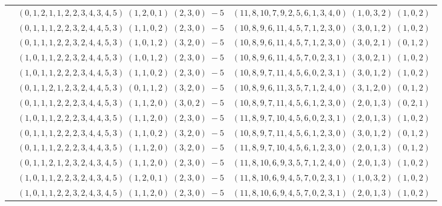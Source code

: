 \documentclass[11pt]{article}
\begin{document}
\begin{longtable}[l]{|c|c|c|}
 \cline{2-3} 
 & $(0 ,1 ,2 ,1 ,1 ,2 ,2 ,3 ,4 ,3 ,4 ,5) \;(1 ,2 ,0 ,1) \;(2 ,3 ,0) \;-5$ & $(11 ,8 ,10 ,7 ,9 ,2 ,5 ,6 ,1 ,3 ,4 ,0) \;(1 ,0 ,3 ,2) \;(1 ,0 ,2) \;$\\ 
 \cline{2-3} 
 & $(0 ,1 ,1 ,1 ,2 ,2 ,3 ,2 ,4 ,4 ,5 ,3) \;(1 ,1 ,0 ,2) \;(2 ,3 ,0) \;-5$ & $(10 ,8 ,9 ,6 ,11 ,4 ,5 ,7 ,1 ,2 ,3 ,0) \;(3 ,0 ,1 ,2) \;(1 ,0 ,2) \;$\\ 
 \cline{2-3} 
 & $(0 ,1 ,1 ,1 ,2 ,2 ,3 ,2 ,4 ,4 ,5 ,3) \;(1 ,0 ,1 ,2) \;(3 ,2 ,0) \;-5$ & $(10 ,8 ,9 ,6 ,11 ,4 ,5 ,7 ,1 ,2 ,3 ,0) \;(3 ,0 ,2 ,1) \;(0 ,1 ,2) \;$\\ 
 \cline{2-3} 
 & $(1 ,0 ,1 ,1 ,2 ,2 ,3 ,2 ,4 ,4 ,5 ,3) \;(1 ,0 ,1 ,2) \;(2 ,3 ,0) \;-5$ & $(10 ,8 ,9 ,6 ,11 ,4 ,5 ,7 ,0 ,2 ,3 ,1) \;(3 ,0 ,2 ,1) \;(1 ,0 ,2) \;$\\ 
 \cline{2-3} 
 & $(1 ,0 ,1 ,1 ,2 ,2 ,2 ,3 ,4 ,4 ,5 ,3) \;(1 ,1 ,0 ,2) \;(2 ,3 ,0) \;-5$ & $(10 ,8 ,9 ,7 ,11 ,4 ,5 ,6 ,0 ,2 ,3 ,1) \;(3 ,0 ,1 ,2) \;(1 ,0 ,2) \;$\\ 
 \cline{2-3} 
 & $(0 ,1 ,1 ,2 ,1 ,2 ,3 ,2 ,4 ,4 ,5 ,3) \;(0 ,1 ,1 ,2) \;(3 ,2 ,0) \;-5$ & $(10 ,8 ,9 ,6 ,11 ,3 ,5 ,7 ,1 ,2 ,4 ,0) \;(3 ,1 ,2 ,0) \;(0 ,1 ,2) \;$\\ 
 \cline{2-3} 
 & $(0 ,1 ,1 ,1 ,2 ,2 ,2 ,3 ,4 ,4 ,5 ,3) \;(1 ,1 ,2 ,0) \;(3 ,0 ,2) \;-5$ & $(10 ,8 ,9 ,7 ,11 ,4 ,5 ,6 ,1 ,2 ,3 ,0) \;(2 ,0 ,1 ,3) \;(0 ,2 ,1) \;$\\ 
 \cline{2-3} 
 & $(1 ,0 ,1 ,1 ,2 ,2 ,2 ,3 ,4 ,4 ,3 ,5) \;(1 ,1 ,2 ,0) \;(2 ,3 ,0) \;-5$ & $(11 ,8 ,9 ,7 ,10 ,4 ,5 ,6 ,0 ,2 ,3 ,1) \;(2 ,0 ,1 ,3) \;(1 ,0 ,2) \;$\\ 
 \cline{2-3} 
 & $(0 ,1 ,1 ,1 ,2 ,2 ,2 ,3 ,4 ,4 ,5 ,3) \;(1 ,1 ,0 ,2) \;(3 ,2 ,0) \;-5$ & $(10 ,8 ,9 ,7 ,11 ,4 ,5 ,6 ,1 ,2 ,3 ,0) \;(3 ,0 ,1 ,2) \;(0 ,1 ,2) \;$\\ 
 \cline{2-3} 
 & $(0 ,1 ,1 ,1 ,2 ,2 ,2 ,3 ,4 ,4 ,3 ,5) \;(1 ,1 ,2 ,0) \;(3 ,2 ,0) \;-5$ & $(11 ,8 ,9 ,7 ,10 ,4 ,5 ,6 ,1 ,2 ,3 ,0) \;(2 ,0 ,1 ,3) \;(0 ,1 ,2) \;$\\ 
 \cline{2-3} 
 & $(0 ,1 ,1 ,2 ,1 ,2 ,3 ,2 ,4 ,3 ,4 ,5) \;(1 ,1 ,2 ,0) \;(2 ,3 ,0) \;-5$ & $(11 ,8 ,10 ,6 ,9 ,3 ,5 ,7 ,1 ,2 ,4 ,0) \;(2 ,0 ,1 ,3) \;(1 ,0 ,2) \;$\\ 
 \cline{2-3} 
 & $(1 ,0 ,1 ,1 ,2 ,2 ,3 ,2 ,4 ,3 ,4 ,5) \;(1 ,2 ,0 ,1) \;(2 ,3 ,0) \;-5$ & $(11 ,8 ,10 ,6 ,9 ,4 ,5 ,7 ,0 ,2 ,3 ,1) \;(1 ,0 ,3 ,2) \;(1 ,0 ,2) \;$\\ 
 \cline{2-3} 
 & $(1 ,0 ,1 ,1 ,2 ,2 ,3 ,2 ,4 ,3 ,4 ,5) \;(1 ,1 ,2 ,0) \;(2 ,3 ,0) \;-5$ & $(11 ,8 ,10 ,6 ,9 ,4 ,5 ,7 ,0 ,2 ,3 ,1) \;(2 ,0 ,1 ,3) \;(1 ,0 ,2) \;$\\ 

\end{longtable}
\end{document}

